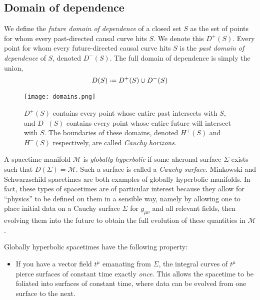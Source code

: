 \documentclass[10pt]{article}
\newcommand*{\defeq}{\mathrel{\vcenter{\baselineskip0.5ex \lineskiplimit0pt
                     \hbox{\scriptsize.}\hbox{\scriptsize.}}}%
                     =}
\begin{document}
            \subsection{Domain of dependence}
            We define the \textit{future domain of dependence} of a closed set $S$ as the set of points for whom every past-directed causal curve hits $S$. We denote this $D^+(S)$. Every point for whom every future-directed causal curve hits $S$ is the \textit{past domain of dependence} of $S$, denoted $D^-(S)$. The full domain of dependence is simply the union,
            \begin{align}
                D(S) \defeq D^+(S) \cup D^-(S)
            \end{align}
            
            \begin{figure}[!h]
                \centering
                \texttt{[image: domains.png]}
                \caption{$D^+(S)$ contains every point whose entire past intersects with $S$, and $D^-(S)$ contains every point whose entire future will intersect with $S$. The boundaries of these domains, denoted $H^+(S)$ and $H^-(S)$ respectively, are called \textit{Cauchy horizons}.}
                \label{fig:my_label}
            \end{figure}
            
            \par A spacetime manifold $\mathcal{M}$ is \textit{globally hyperbolic} if some ahcronal surface $\Sigma$ exists such that $D(\Sigma) = \mathcal{M}$. Such a surface is called a \textit{Cauchy surface}. Minkowski and Schwarzschild spacetimes are both examples of globally hyperbolic manifolds. In fact, these types of spacetimes are of particular interest because they allow for ``physics'' to be defined on them in a sensible way, namely by allowing one to place initial data on a Cauchy surface $\Sigma$ for $g_{\mu\nu}$ and all relevant fields, then evolving them into the future to obtain the full evolution of these quantities in $\mathcal{M}$.
            \par Globally hyperbolic spacetimes have the following property:
            \begin{itemize}
                \item If you have a vector field $t^\mu$ emanating from $\Sigma$, the integral curves of $t^\mu$ pierce surfaces of constant time exactly \textit{once}. This allows the spacetime to be foliated into surfaces of constant time, where data can be evolved from one surface to the next.
            \end{itemize}
            
\end{document}
